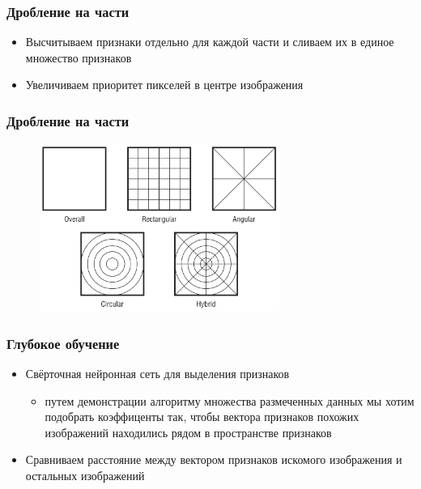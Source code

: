 \documentclass[xetex,mathserif,serif]{beamer}
\begin{document}
\begin{frame}
	\frametitle{Дробление на части}

	\begin{itemize}
		\item Высчитываем признаки отдельно для каждой части и сливаем их в единое множество признаков
		\item Увеличиваем приоритет пикселей в центре изображения
	\end{itemize}
\end{frame}



\begin{frame}
	\frametitle{Дробление на части}

    \begin{figure}[h]
        \includegraphics[width=0.7\textwidth]{./images/spartial.png}
        \centering
    \end{figure}
\end{frame}



\begin{frame}
	\frametitle{Глубокое обучение}

	\begin{itemize}
		\item Свёрточная нейронная сеть для выделения признаков
            \begin{itemize}
                \item путем демонстрации алгоритму множества размеченных данных мы хотим подобрать коэффиценты так, чтобы вектора признаков похожих изображений находились рядом в пространстве признаков
            \end{itemize}
		\item Сравниваем расстояние между вектором признаков искомого изображения и остальных изображений
	\end{itemize}
\end{frame}
\end{document}
